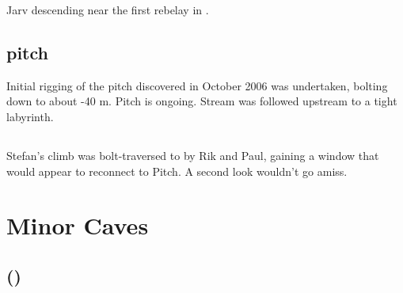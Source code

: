 \begin{marginfigure}
\caption{Jarv descending near the first rebelay in . }
\end{marginfigure}


\subsection{\protect{} \protect{}
pitch}

Initial rigging of the  pitch discovered in October 2006 was
undertaken, bolting down to about -40 m. Pitch is ongoing.
Stream was followed upstream to a tight labyrinth.

\subsection{\protect{}}

Stefan's climb was bolt-traversed to by Rik and Paul, gaining a window
that would appear to reconnect to  Pitch. A second look
wouldn't go amiss.

\section{Minor Caves}

\subsection{\protect{} (\protect{})}

